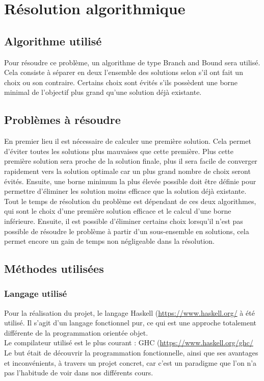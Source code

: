 \documentclass[a4paper, 12pt]{report}
\begin{document}
\chapter{Résolution algorithmique}
\section{Algorithme utilisé}

Pour résoudre ce problème, un algorithme de type Branch and Bound sera utilisé.
Cela consiste à séparer en deux l'ensemble des solutions selon s'il ont fait un choix ou son contraire.
Certains choix sont évités s'ils possèdent une borne minimal de l'objectif plus grand qu'une solution déjà existante. 

\section{Problèmes à résoudre}
En premier lieu il est nécessaire de calculer une première solution. 
Cela permet d'éviter toutes les solutions plus mauvaises que cette première.
Plus cette première solution sera proche de la solution finale, 
plus il sera facile de converger rapidement vers la solution optimale car un plus grand nombre de choix seront évités.
\newline{}
\newline{}
Ensuite, une borne minimum la plus élevée possible doit être définie 
pour permettre d'éliminer les solution moins efficace que la solution déjà existante. 
Tout le temps de résolution du problème est dépendant de ces deux algorithmes, 
qui sont le choix d'une première solution efficace et le calcul d'une borne inférieure. 
\newline{}
\newline{}
Ensuite, il est possible d'éliminer certains choix lorsqu'il n'est pas possible de résoudre le problème 
à partir d'un sous-ensemble en solutions, cela permet encore un gain de temps non négligeable dans la résolution.

\section{Méthodes utilisées}
\subsection{Langage utilisé}
Pour la réalisation du projet, le langage Haskell (\url{https://www.haskell.org/} à été utilisé. 
Il s'agit d'un langage fonctionnel pur, ce qui est une approche 
totalement différente de la programmation orientée objet. \\
Le compilateur utilisé est le plus courant : GHC (\url{https://www.haskell.org/ghc/}
Le but était de découvrir la programmation fonctionnelle, ainsi que ses avantages et inconvénients, à travers un projet concret, 
car c'est un paradigme que l'on n'a pas l'habitude de voir dans nos différents cours. 
\end{document}
